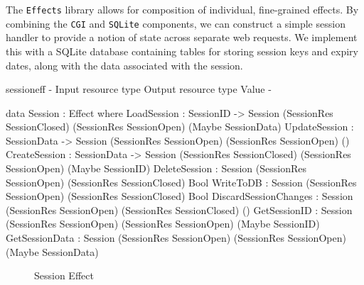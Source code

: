 The \texttt{Effects} library allows for composition of individual, fine-grained
effects. By combining the \texttt{CGI} and \texttt{SQLite} components, we can
construct a simple session handler to provide a notion of state across separate
web requests. 
We implement this with a SQLite database containing tables for storing
session keys and expiry dates, along with the data associated with
the session.


\begin{SaveVerbatim}{sessioneff}
{-                        { Input resource type }            { Output resource type }   { Value }        -}

data Session : Effect where
  LoadSession           : SessionID -> 
                          Session (SessionRes SessionClosed) (SessionRes SessionOpen)   (Maybe SessionData)
  UpdateSession         : SessionData -> 
                          Session (SessionRes SessionOpen)   (SessionRes SessionOpen)   ()
  CreateSession         : SessionData -> 
                          Session (SessionRes SessionClosed) (SessionRes SessionOpen)   (Maybe SessionID)
  DeleteSession         : Session (SessionRes SessionOpen)   (SessionRes SessionClosed) Bool 
  WriteToDB             : Session (SessionRes SessionOpen)   (SessionRes SessionClosed) Bool
  DiscardSessionChanges : Session (SessionRes SessionOpen)   (SessionRes SessionClosed) ()
  GetSessionID          : Session (SessionRes SessionOpen)   (SessionRes SessionOpen)   (Maybe SessionID)
  GetSessionData        : Session (SessionRes SessionOpen)   (SessionRes SessionOpen)   (Maybe SessionData)
\end{SaveVerbatim}

\begin{figure*}[t]
\begin{center}
\end{center}
\caption{Session Effect}
\label{fig:sessioneffect}
\end{figure*}

